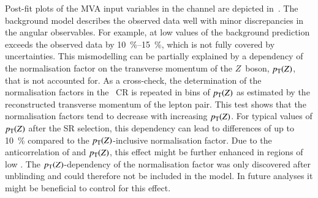 Post-fit plots of the MVA input variables in the \hadhad channel are depicted
in~. The background model describes the observed
data well with minor discrepancies in the angular observables. For example, at
low values of \dRtautau the background prediction exceeds the observed data by
\SIrange[range-units=single]{10}{15}{\percent}, which is not fully covered by uncertainties. This
mismodelling can be partially explained by a dependency of the \ZHF
normalisation factor on the transverse momentum of the $Z$~boson, $p_{\text{T}}(Z)$, that
is not accounted for. As a cross-check, the determination of the normalisation
factors in the \ZHF~CR is repeated in bins of $p_{\text{T}}(Z)$ as estimated by the
reconstructed transverse momentum of the lepton pair. This test shows that the
\ZHF normalisation factors tend to decrease with increasing $p_{\text{T}}(Z)$. For
typical values of $p_{\text{T}}(Z)$ after the \hadhad SR selection, this dependency can
lead to differences of up to \SI{10}{\percent} compared to the
$p_{\text{T}}(Z)$-inclusive normalisation factor. Due to the anticorrelation of \dRtautau
and $p_{\text{T}}(Z)$, this effect might be further enhanced in regions of low
\dRtautau. The $p_{\text{T}}(Z)$-dependency of the normalisation factor was only
discovered after unblinding and could therefore not be included in the model. In
future analyses it might be beneficial to control for this effect.


